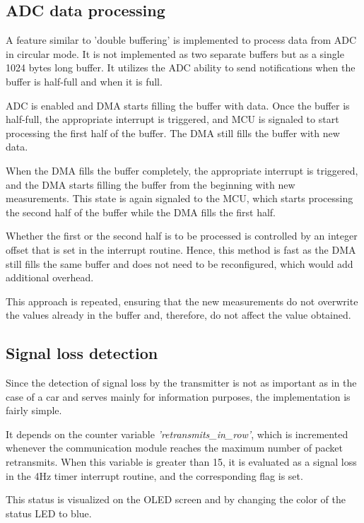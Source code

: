 \subsection{ADC data processing}
\label{sub:adc}
A feature similar to 'double buffering' is implemented to process data from ADC in circular mode. It is not implemented as two separate buffers but as a single 1024 bytes long buffer. It utilizes the ADC ability to send notifications when the buffer is half-full and when it is full.

ADC is enabled and DMA starts filling the buffer with data. Once the buffer is half-full, the appropriate interrupt is triggered, and MCU is signaled to start processing the first half of the buffer. The DMA still fills the buffer with new data.

When the DMA fills the buffer completely, the appropriate interrupt is triggered, and the DMA starts filling the buffer from the beginning with new measurements. This state is again signaled to the MCU, which starts processing the second half of the buffer while the DMA fills the first half.

Whether the first or the second half is to be processed is controlled by an integer offset that is set in the interrupt routine. Hence, this method is fast as the DMA still fills the same buffer and does not need to be reconfigured, which would add additional overhead.

This approach is repeated, ensuring that the new measurements do not overwrite the values already in the buffer and, therefore, do not affect the value obtained.

\subsection{Signal loss detection}
\label{sub:tx_sig_loss}
Since the detection of signal loss by the transmitter is not as important as in the case of a car and serves mainly for information purposes, the implementation is fairly simple.

It depends on the counter variable \textit{'retransmits\_in\_row'}, which is incremented whenever the communication module reaches the maximum number of packet retransmits. When this variable is greater than 15, it is evaluated as a signal loss in the 4Hz timer interrupt routine, and the corresponding flag is set.

This status is visualized on the OLED screen and by changing the color of the status LED to blue.

